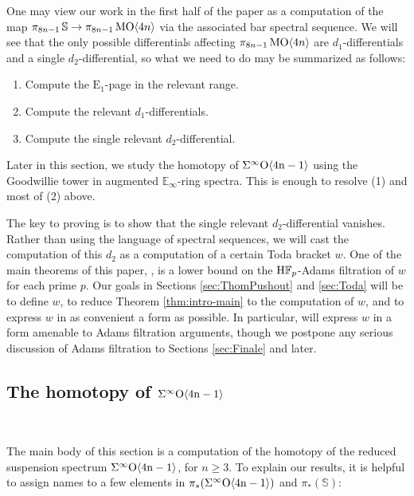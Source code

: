 One may view our work in the first half of the paper as a computation of the map $\pi_{8n-1} \operatorname{\mathbb{S}} \to \pi_{8n-1} \operatorname{\mathrm{MO}} \langle 4n \rangle$ via the associated bar spectral sequence. We will see that the only possible differentials affecting $\pi_{8n-1} \operatorname{\mathrm{MO}} \langle 4n \rangle$ are $d_1$-differentials and a single $d_2$-differential, so what we need to do may be summarized as follows:
\begin{enumerate}
    \item Compute the $\mathrm{E}_1$-page in the relevant range.
    \item Compute the relevant $d_1$-differentials.
    \item Compute the single relevant $d_2$-differential.
\end{enumerate}
Later in this section, we study the homotopy of $\Sigma^{\infty} \mathrm{O \langle 4n-1\rangle}$ using the Goodwillie tower in augmented $\mathbb{E}_\infty$-ring spectra.  This is enough to resolve (1) and most of (2) above.

The key to proving  is to show that the single relevant $d_2$-differential vanishes.  Rather than using the language of spectral sequences, we will cast the computation of this $d_2$ as a computation of a certain Toda bracket $w$.  One of the main theorems of this paper, , is a lower bound on the $\mathrm{H}\mathbb{F}_p$-Adams filtration of $w$ for each prime $p$.  Our goals in Sections \ref{sec:ThomPushout} and \ref{sec:Toda} will be to define $w$, to reduce Theorem \ref{thm:intro-main} to the computation of $w$, and to express $w$ in as convenient a form as possible.  In particular,  will express $w$ in a form amenable to Adams filtration arguments, though we postpone any serious discussion of Adams filtration to Sections \ref{sec:Finale} and later.

\subsection{The homotopy of $\Sigma^{\infty} \mathrm{O \langle 4n-1\rangle}$}\

The main body of this section is a computation of the homotopy of the reduced suspension spectrum $\Sigma^{\infty} \mathrm{O \langle 4n-1\rangle}$, for $n\ge 3$.  To explain our results, it is helpful to assign names to a few elements in $\pi_*(\Sigma^{\infty} \mathrm{O \langle 4n-1\rangle})$ and $\pi_*(\mathbb{S})$:

